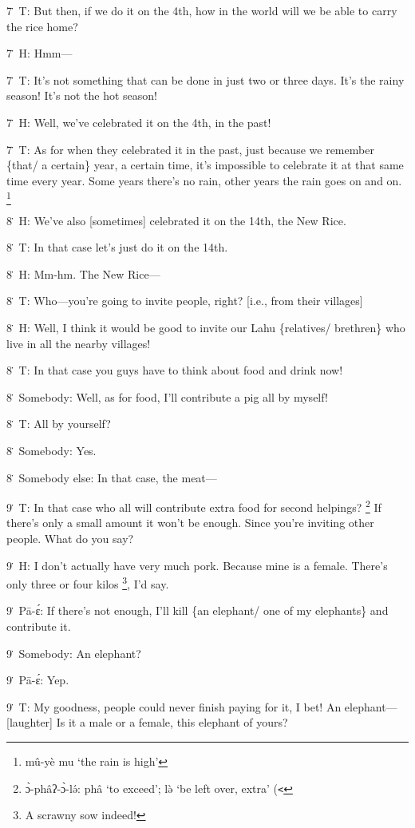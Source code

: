 7\. T: But then, if we do it on the 4th, how in the world will we be able to carry
the rice home?

7\. H: Hmm---

7\. T: It's not something that can be done in just two or three days.  It's the
rainy season!  It's not the hot season!

7\. H: Well, we've celebrated it on the 4th, in the past!

7\. T: As for when they celebrated it in the past, just because we remember \{that/
a certain\} year, a certain time, it's impossible to celebrate it at that same
time every year.  Some years there's no rain, other years the rain goes on and
on. \footnote{mû-yè mu `the rain is high'}

8\. H: We've also [sometimes] celebrated it on the 14th, the New Rice.

8\. T: In that case let's just do it on the 14th.

8\. H: Mm-hm.  The New Rice---

8\. T: Who---you're going to invite people, right? [i.e., from their villages]

8\. H: Well, I think it would be good to invite our Lahu \{relatives/ brethren\}
who live in all the nearby villages!

8\. T: In that case you guys have to think about food and drink now!

8\. Somebody: Well, as for food, I'll contribute a pig all by myself!

8\. T: All by yourself?

8\.  Somebody: Yes.

8\. Somebody else: In that case, the meat---

9\. T: In that case who all will contribute extra food for second helpings? \footnote{ɔ̀-phâʔ-ɔ̀-lə́: phâ `to exceed'; lə̀ `be left over, extra' (\texttt{<}}
If there's only a small amount it won't be enough.  Since you're inviting other
people.  What do you say?

9\. H: I don't actually have very much pork.  Because mine is a female.  There's
only three or four kilos \footnote{A scrawny sow indeed!}, I'd say.

9\. Pā-ɛ́: If there's not enough, I'll kill \{an elephant/ one of my elephants\}
and contribute it.

9\. Somebody: An elephant?

9\. Pā-ɛ́: Yep.

9\. T: My goodness, people could never finish paying for it, I bet!  An elephant---[laughter]
Is it a male or a female, this elephant of yours?

